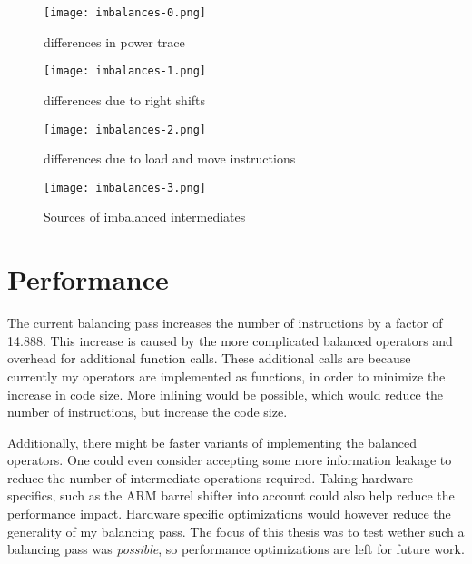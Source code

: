 \begin{sidewaysfigure}[h]
  \centering
  \texttt{[image: imbalances-0.png]}
  \caption{\hammingw{} differences in power trace}
  \label{fig:imbalances0}
\end{sidewaysfigure}

\begin{sidewaysfigure}[h]
  \centering
  \texttt{[image: imbalances-1.png]}
  \caption{\hammingw{} differences due to right shifts}
  \label{fig:imbalances1}
\end{sidewaysfigure}

\begin{sidewaysfigure}[h]
  \centering
  \texttt{[image: imbalances-2.png]}
  \caption{\hammingw{} differences due to load and move instructions}
  \label{fig:imbalances2}
\end{sidewaysfigure}

\begin{sidewaysfigure}[h]
  \centering
  \texttt{[image: imbalances-3.png]}
  \caption{Sources of imbalanced intermediates}
  \label{fig:imbalances3}
\end{sidewaysfigure}

\section{Performance}
The current balancing pass increases the number of instructions by a factor of 14.888.
This increase is caused by the more complicated balanced operators and overhead for additional function calls.
These additional calls are because currently my operators are implemented as functions, in order to minimize the increase in code size.
More inlining would be possible, which would reduce the number of instructions, but increase the code size.

Additionally, there might be faster variants of implementing the balanced operators.
One could even consider accepting some more information leakage to reduce the number of intermediate operations required.
Taking hardware specifics, such as the ARM barrel shifter into account could also help reduce the performance impact.
Hardware specific optimizations would however reduce the generality of my balancing pass.
The focus of this thesis was to test wether such a balancing pass was \emph{possible}, so performance optimizations are left for future work.
